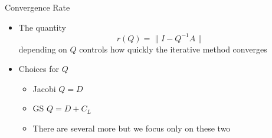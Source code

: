 \documentclass[10pt]{beamer}
\begin{document}
\begin{frame}{Convergence Rate}
\begin{itemize}
    \item The quantity $$r(Q)=\|I-Q^{-1}A\|$$ 
    depending on $Q$ controls how quickly the iterative method converges\\[3mm]

    \item Choices for $Q$
    \begin{itemize}
        \item Jacobi $Q=D$
        \item GS $Q=D+C_L$  
        \item There are several more but we focus only on these two
    \end{itemize}

\end{itemize}
\end{frame}
\end{document}
